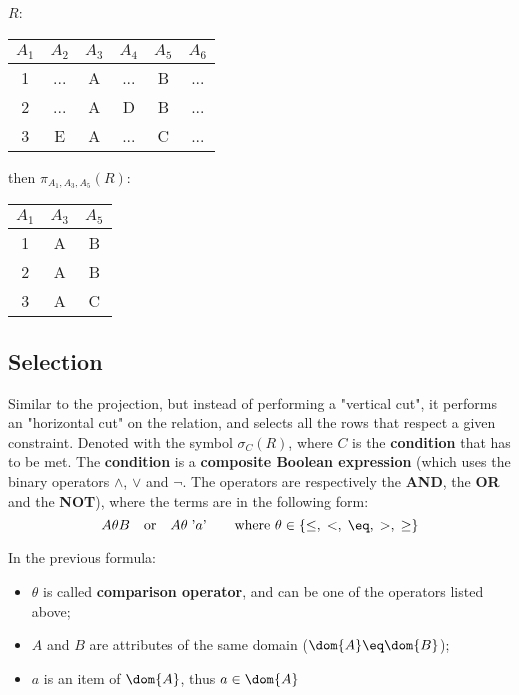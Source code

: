 \begin{center}
    $R$: \quad \begin{tabular}{|c|c|c|c|c|c|}
        \hline \rowcolor{maindoccol!60}
        $A_1$ & $A_2$ & $A_3$ & $A_4$ & $A_5$ & $A_6$ \\
        \hline
        1 & ... & A & ... & B & ... \\
        \hline
        2 & ... & A & D & B & ... \\
        \hline
        3 & E & A & ... & C & ... \\
        \hline
    \end{tabular}
    \quad then $\pi_{A_1, A_3, A_5}(R)$: \quad \begin{tabular}{|c|c|c|}
        \hline \rowcolor{maindoccol!60}
        $A_1$ & $A_3$ & $A_5$ \\
        \hline
        1 & A & B \\
        \hline
        2 & A & B \\
        \hline
        3 & A & C \\
        \hline
    \end{tabular}
\end{center}

\subsection{Selection}

Similar to the projection, but instead of performing a "vertical cut", it performs an "horizontal cut" on the relation, and selects all the rows that respect a given constraint. Denoted with the symbol $\sigma_C(R)$, where $C$ is the \textbf{condition} that has to be met. The \textbf{condition} is a \textbf{composite Boolean expression} (which uses the binary operators $\wedge$, $\vee$ and $\neg$. The operators are respectively the \textbf{AND}, the \textbf{OR} and the \textbf{NOT}), where the terms are in the following form:
\[ A \theta B \quad \text{or} \quad A \theta \; \text{'}a\text{'} \quad \quad \text{where } \theta \in \{ \leq, \; <, \; \eq, \; >, \; \geq \} \]

In the previous formula:
\begin{itemize}
    \item $\theta$ is called \textbf{comparison operator}, and can be one of the operators listed above;
    \item $A$ and $B$ are attributes of the same domain ($\dom{A} \eq \dom{B}$);
    \item $a$ is an item of $\dom{A}$, thus $a \in \dom{A}$
\end{itemize}

